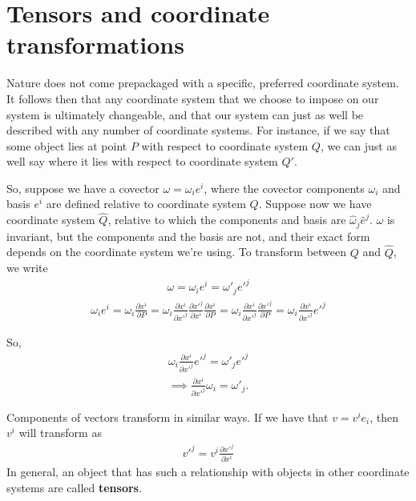 \documentclass{book}
\begin{document}
\section{Tensors and coordinate transformations}


Nature does not come prepackaged with a specific, preferred coordinate system. It follows then that any coordinate system that we choose to impose on our system is ultimately changeable, and that our system can just as well be described with any number of coordinate systems. For instance, if we say that some object lies at point $P$ with respect to coordinate system $Q$, we can just as well say where it lies with respect to coordinate system $Q'$. 


So, suppose we have a covector $\omega = \omega_i e^i$, where the covector components $\omega_i$ and basis $e^i$ are defined relative to coordinate system $Q$. Suppose now we have coordinate system $\hat{Q}$, relative to which the components and basis are $\hat{\omega}_j\hat{e}^j$. $\omega$ is invariant, but the components and the basis are not, and their exact form depends on the coordinate system we're using. To transform between $Q$ and $\hat{Q}$, we write \begin{gather}\omega = \omega_i e^i = \omega'_j e'^j  \end{gather}
\begin{gather}\omega_i e^i = \omega_i \frac{\partial x^i}{\partial P} = \omega_i \frac{\partial x^i}{\partial x'^j} \frac{\partial x'^j}{\partial x^i} \frac{\partial x^i}{\partial P}=  \omega_i \frac{\partial x^i}{\partial x'^j} \frac{\partial x'^j}{\partial P} = \omega_i \frac{\partial x^i}{\partial x'^j} e'^j\end{gather} 

So, \begin{gather}
\omega_i \frac{\partial x^i}{\partial x'^j} e'^j = \omega'_j e'^j
\end{gather}
\begin{gather} \implies  \frac{\partial x^i}{\partial x'^j} \omega_i = \omega'_j.
\end{gather}

Components of vectors transform in similar ways. If we have that $v = v^i e_i$, then $v^i$ will transform as \begin{gather}v'^j = v^i \frac{\partial x'^j}{\partial x^i} \end{gather} In general, an object that has such a relationship with objects in other coordinate systems are called \textbf{tensors}. 
\end{document}

